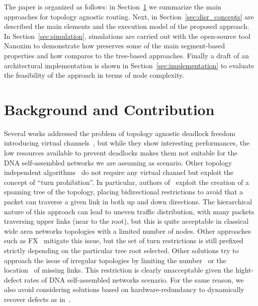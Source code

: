 The paper is organized as follows: in Section~\ref{sec:related_works}
we summarize the main approaches for topology agnostic routing. Next, in
Section~\ref{sec:disr_concepts} are described the main elements and
the execution model of the proposed approach. In Section~\ref{sec:simulation},
simulations are carried out with the open-source tool Nanoxim to
demonstrate how \disr{} preserves some of the main segment-based
properties and how compares to the tree-based approaches. Finally a
draft of an architectural implementation is shown in
Section~\ref{sec:implementation} to evaluate the feasibility of the
approach in terms of node complexity.

\section{Background and Contribution}
\label{sec:related_works}
Several works addressed the problem of topology agnostic deadlock
freedom introducing virtual channels~\cite{sancho2002, skeie2002,
skeie2004, koibuchi2003}, but while they show interesting
performances, the low resources available to prevent deadlocks makes them not suitable for
the DNA self-assembled networks we are assuming as
scenario.
Other topology independent algorithms~\cite{schroeder1991,
koibuchi2001, cherkasova1996} do not require any virtual channel but
exploit the concept of ``turn prohibition''.
In particular, authors of~\cite{Patwardhan05evaluatingthe} exploit the creation of a spanning tree of the
topology, placing bidirectional restrictions to avoid that a packet
can traverse a given link in both up and down directions.
The hierarchical nature of this approach can lead to uneven traffic
distribution, with many packets traversing upper links (near to the
root), but this is quite acceptable in classical wide area networks
topologies with a limited number of nodes. Other approaches such as
FX~\cite{sancho2000} mitigate this
issue, but the set of turn restrictions is still prefixed
strictly depending on the particular tree root selected. 
Other solutions try to approach the issue of irregular
topologies by limiting the number~\cite{duato1997, gomez2004, koibuchi2008} or the
location~\cite{zhang2008, flich2008, liu2011} of missing links. This
restriction is clearly unacceptable given the hight-defect rates of
DNA self-assembled networks scenario. For the same reason, we also
avoid considering solutions based on hardware-redundancy to
dynamically recover defects as in~\cite{constantinides2006, kohler2010,  park2006, ebrahimi2013}. 

